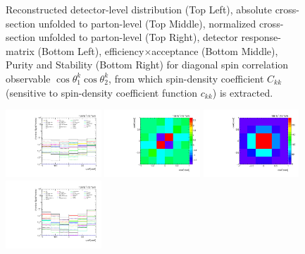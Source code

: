 \begin{refsection}
\begin{figure}[htb]
\begin{center}
\caption{Reconstructed detector-level distribution (Top Left), absolute cross-section unfolded to parton-level (Top Middle), normalized cross-section unfolded to parton-level (Top Right), detector response-matrix (Bottom Left), efficiency$\times$acceptance (Bottom Middle), Purity and Stability (Bottom Right) for diagonal spin correlation observable $\cos\theta_{1}^{k}\cos\theta_{2}^{k}$, from which spin-density coefficient $C_{kk}$ (sensitive to spin-density coefficient function $c_{k k}$) is extracted.}
\label{fig:c_kk}
\end{center}
\end{figure}
\clearpage
\begin{figure}[htb]
\begin{center}
 \includegraphics[width=0.32\textwidth]{fig_fullRun2UL/unfolding/combined/deltaSystCombinedlog_rebinnedB_c_kk.pdf}
 \includegraphics[width=0.32\textwidth]{fig_fullRun2UL/unfolding/combined/StatCovMatrix_rebinnedB_c_kk.pdf}
 \includegraphics[width=0.32\textwidth]{fig_fullRun2UL/unfolding/combined/TotalSystCovMatrix_rebinnedB_c_kk.pdf} \\
 \includegraphics[width=0.32\textwidth]{fig_fullRun2UL/unfolding/combined/deltaSystCombinedlogNorm_rebinnedB_c_kk.pdf}

\end{center}
\end{figure}
\end{refsection}
